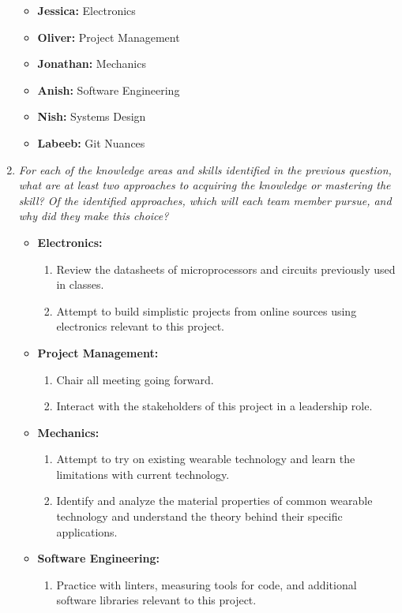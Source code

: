 \documentclass[12pt]{article}
\begin{document}
\begin{enumerate}
	\begin{itemize}
	\item \textbf{Jessica:} Electronics
	\item \textbf{Oliver:} Project Management
	\item \textbf{Jonathan:} Mechanics
	\item \textbf{Anish:} Software Engineering
	\item \textbf{Nish:} Systems Design
	\item \textbf{Labeeb:} Git Nuances
	\end{itemize}
  \item \textit{For each of the knowledge areas and skills identified in the previous
        question, what are at least two approaches to acquiring the knowledge or
        mastering the skill?  Of the identified approaches, which will each team
        member pursue, and why did they make this choice?}
	\begin{itemize}
	\item \textbf{Electronics:}
		\begin{enumerate}
		\item Review the datasheets of microprocessors and circuits previously used in classes.
		\item Attempt to build simplistic projects from online sources using electronics relevant to this project.
		\end{enumerate}
	\item \textbf{Project Management:}
		\begin{enumerate}
		\item Chair all meeting going forward.
		\item Interact with the stakeholders of this project in a leadership role.
		\end{enumerate}
	\item \textbf{Mechanics:}
		\begin{enumerate}
		\item Attempt to try on existing wearable technology and learn the limitations with current technology.
		\item Identify and analyze the material properties of common wearable technology and understand the theory behind their specific applications.
		\end{enumerate}
	\item \textbf{Software Engineering:}
		\begin{enumerate}
		\item Practice with linters, measuring tools for code, and additional software libraries relevant to this project.

\end{enumerate}
\end{itemize}
\end{enumerate}
\end{document}

